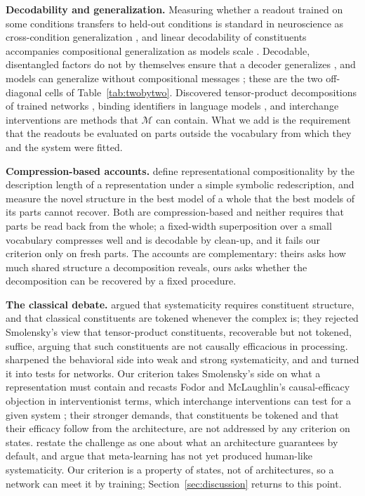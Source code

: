 \documentclass[10pt]{article}
\theoremstyle{plain}
\theoremstyle{remark}
\newcommand{\M}{\mathcal{M}}
\begin{document}
\textbf{Decodability and generalization.} Measuring whether a readout trained on some conditions transfers to held-out conditions is standard in neuroscience as cross-condition generalization \citep{bernardi2020,ito2022}, and linear decodability of constituents accompanies compositional generalization as models scale \citep{redhardt2025}. Decodable, disentangled factors do not by themselves ensure that a decoder generalizes \citep{montero2021}, and models can generalize without compositional messages \citep{chaabouni2020}; these are the two off-diagonal cells of Table~\ref{tab:twobytwo}. Discovered tensor-product decompositions of trained networks \citep{mccoy2019,soulos2020}, binding identifiers in language models \citep{feng2024}, and interchange interventions \citep{geiger2021,geiger2024das} are methods that $\M$ can contain. What we add is the requirement that the readouts be evaluated on parts outside the vocabulary from which they and the system were fitted.

\textbf{Compression-based accounts.} \citet{elmoznino2024} define representational compositionality by the description length of a representation under a simple symbolic redescription, and \citet{elmoznino2026} measure the novel structure in the best model of a whole that the best models of its parts cannot recover. Both are compression-based and neither requires that parts be read back from the whole; a fixed-width superposition over a small vocabulary compresses well and is decodable by clean-up, and it fails our criterion only on fresh parts. The accounts are complementary: theirs asks how much shared structure a decomposition reveals, ours asks whether the decomposition can be recovered by a fixed procedure.

\textbf{The classical debate.} \citet{fodor1988} argued that systematicity requires constituent structure, and \citet{fodor1990} that classical constituents are tokened whenever the complex is; they rejected Smolensky's view \citep{smolensky1987,smolensky1988,smolensky1990} that tensor-product constituents, recoverable but not tokened, suffice, arguing that such constituents are not causally efficacious in processing. \citet{hadley1994} sharpened the behavioral side into weak and strong systematicity, and \citet{hupkes2020} and \citet{vegner2025} turned it into tests for networks. Our criterion takes Smolensky's side on what a representation must contain and recasts Fodor and McLaughlin's causal-efficacy objection in interventionist terms, which interchange interventions can test for a given system \citep{geiger2021}; their stronger demands, that constituents be tokened and that their efficacy follow from the architecture, are not addressed by any criterion on states. \citet{goodale2026} restate the challenge as one about what an architecture guarantees by default, and \citet{woydt2025} argue that meta-learning \citep{lake2023} has not yet produced human-like systematicity. Our criterion is a property of states, not of architectures, so a network can meet it by training; Section~\ref{sec:discussion} returns to this point.
\end{document}
